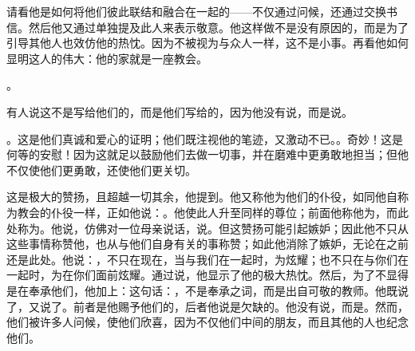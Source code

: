 \par

请看他是如何将他们彼此联结和融合在一起的——不仅通过问候，还通过交换书信。然后他又通过单独提及此人来表示敬意。他这样做不是没有原因的，而是为了引导其他人也效仿他的热忱。因为不被视为与众人一样，这不是小事。再看他如何显明这人的伟大：他的家就是一座教会。\par

。\par

有人说这不是写给他们的，而是他们写给的，因为他没有说，而是说。\par

\par

。这是他们真诚和爱心的证明；他们既注视他的笔迹，又激动不已。。奇妙！这是何等的安慰！因为这就足以鼓励他们去做一切事，并在磨难中更勇敢地担当；但他不仅使他们更勇敢，还使他们更关切。\par

这是极大的赞扬，且超越一切其余，他提到。他又称他为他们的仆役，如同他自称为教会的仆役一样，正如他说：。他使此人升至同样的尊位；前面他称他为，而此处称为。他说，仿佛对一位母亲说话，说。但这赞扬可能引起嫉妒；因此他不只从这些事情称赞他，也从与他们自身有关的事称赞；如此他消除了嫉妒，无论在之前还是此处。他说：，不只在现在，当与我们在一起时，为炫耀；也不只在与你们在一起时，为在你们面前炫耀。通过说，他显示了他的极大热忱。然后，为了不显得是在奉承他们，他加上：这句话：，不是奉承之词，而是出自可敬的教师。他既说了，又说了。前者是他赐予他们的，后者他说是欠缺的。他没有说，而是。然而，他们被许多人问候，使他们欣喜，因为不仅他们中间的朋友，而且其他的人也纪念他们。\par

